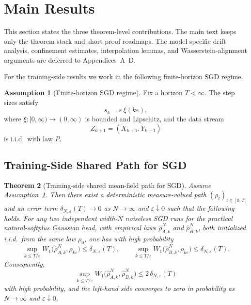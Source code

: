 \documentclass[11pt]{article}
\newtheorem{theorem}{Theorem}
\theoremstyle{definition}
\newtheorem{assumption}[theorem]{Assumption}
\begin{document}
\section{Main Results}

This section states the three theorem-level contributions. The main text keeps
only the theorem stack and short proof roadmaps. The model-specific drift
analysis, confinement estimates, interpolation lemmas, and Wasserstein-alignment
arguments are deferred to Appendices~A--D.

For the training-side results we work in the following finite-horizon SGD
regime.

\begin{assumption}[Finite-horizon SGD regime]
\label{ass:softplus-sgd-k1}
Fix a horizon $T<\infty$. The step sizes satisfy
\[
  s_k=\varepsilon\,\xi(k\varepsilon),
\]
where $\xi:[0,\infty)\to(0,\infty)$ is bounded and Lipschitz, and the data
stream
\[
  Z_{k+1}=(X_{k+1},Y_{k+1})
\]
is i.i.d.\ with law $P$.
\end{assumption}

\subsection{Training-Side Shared Path for SGD}

\begin{theorem}[Training-side shared mean-field path for SGD]
\label{thm:main-shared-path-k1}
Assume Assumption~\ref{ass:softplus-sgd-k1}. Then there exist a deterministic
measure-valued path $(\rho_t)_{t\in[0,T]}$ and an error term
$\delta_{N,\varepsilon}(T)\to 0$ as $N\to\infty$ and $\varepsilon\downarrow 0$
such that the following holds. For any two independent width-$N$ noiseless SGD
runs for the practical natural-softplus Gaussian head, with empirical laws
$\hat\rho_{A,k}^N$ and $\hat\rho_{B,k}^N$, both initialized i.i.d.\ from the
same law $\rho_0$, one has with high probability
\[
  \sup_{k\le T/\varepsilon}
  W_1\!\bigl(\hat\rho_{A,k}^N,\rho_{k\varepsilon}\bigr)
  \le
  \delta_{N,\varepsilon}(T),
  \qquad
  \sup_{k\le T/\varepsilon}
  W_1\!\bigl(\hat\rho_{B,k}^N,\rho_{k\varepsilon}\bigr)
  \le
  \delta_{N,\varepsilon}(T).
\]
Consequently,
\[
  \sup_{k\le T/\varepsilon}
  W_1\!\bigl(\hat\rho_{A,k}^N,\hat\rho_{B,k}^N\bigr)
  \le
  2\,\delta_{N,\varepsilon}(T)
\]
with high probability, and the left-hand side converges to zero in probability
as $N\to\infty$ and $\varepsilon\downarrow 0$.
\end{theorem}
\end{document}
